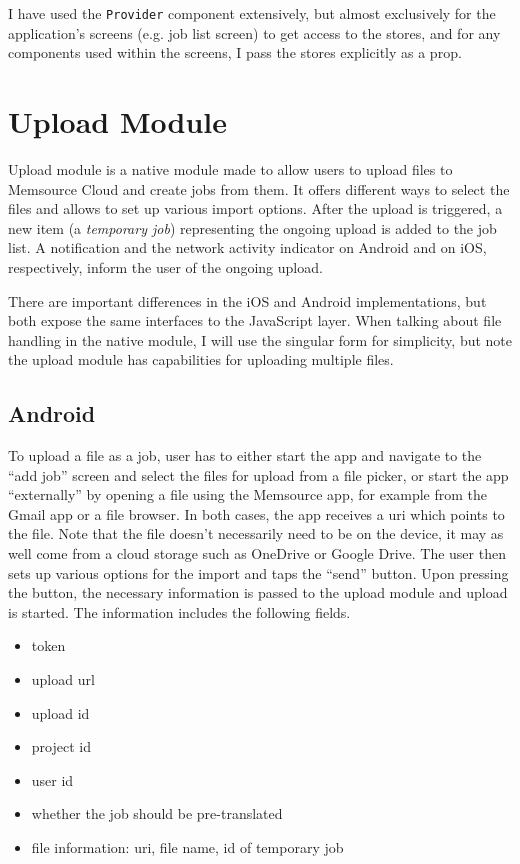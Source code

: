 

I have used the \texttt{Provider} component extensively, but almost exclusively for the application's screens (e.g. job list screen) to get access to the stores, and for any components used within the screens, I pass the stores explicitly as a prop.


\section{Upload Module}
Upload module is a native module made to allow users to upload files to Memsource Cloud and create jobs from them. It offers different ways to select the files and allows to set up various import options. After the upload is triggered, a new item (a \textit{{temporary job}}) representing the ongoing upload is added to the job list. A notification and the network activity indicator on Android and on iOS, respectively, inform the user of the ongoing upload. 

There are important differences in the iOS and Android implementations, but both expose the same interfaces to the JavaScript layer. When talking about file handling in the native module, I will use the singular form for simplicity, but note the upload module has capabilities for uploading multiple files.



\subsection{Android}
To upload a file as a job, user has to either start the app and navigate to the “add job” screen and select the files for upload from a file picker, or start the app “externally” by opening a file using the Memsource app, for example from the Gmail app or a file browser. 
In both cases, the app receives a uri which points to the file. Note that the file doesn't necessarily need to be on the device, it may as well come from a cloud storage such as OneDrive or Google Drive. The user then sets up various options for the import and taps the “send” button. 
Upon pressing the button, the necessary information is passed to the upload module and upload is started. The information includes the following fields.

\begin{itemize}
	\item token
	\item upload url
	\item upload id
	\item project id
	\item user id
	\item whether the job should be pre-translated
	\item file information: uri, file name, id of temporary job
\end{itemize}


